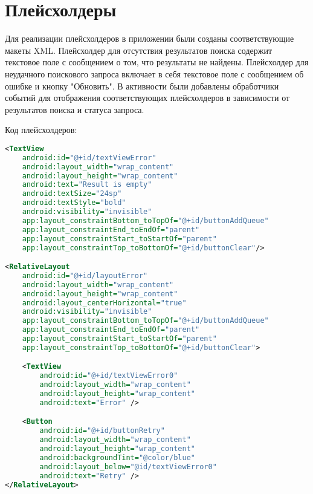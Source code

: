 \section{Плейсхолдеры}

Для реализации плейсхолдеров в приложении были созданы соответствующие макеты
XML. Плейсхолдер для отсутствия результатов поиска содержит текстовое поле
с сообщением о том, что результаты не найдены.
Плейсхолдер для неудачного поискового запроса включает в
себя текстовое поле с сообщением об ошибке и кнопку "Обновить".
В активности были добавлены обработчики событий для отображения
соответствующих плейсхолдеров в зависимости от результатов поиска
и статуса запроса.

Код плейсхолдеров:
\begin{lstlisting}[language=XML]
<TextView
	android:id="@+id/textViewError"
	android:layout_width="wrap_content"
	android:layout_height="wrap_content"
	android:text="Result is empty"
	android:textSize="24sp"
	android:textStyle="bold"
	android:visibility="invisible"
	app:layout_constraintBottom_toTopOf="@+id/buttonAddQueue"
	app:layout_constraintEnd_toEndOf="parent"
	app:layout_constraintStart_toStartOf="parent"
	app:layout_constraintTop_toBottomOf="@+id/buttonClear"/>

<RelativeLayout
	android:id="@+id/layoutError"
	android:layout_width="wrap_content"
	android:layout_height="wrap_content"
	android:layout_centerHorizontal="true"
	android:visibility="invisible"
	app:layout_constraintBottom_toTopOf="@+id/buttonAddQueue"
	app:layout_constraintEnd_toEndOf="parent"
	app:layout_constraintStart_toStartOf="parent"
	app:layout_constraintTop_toBottomOf="@+id/buttonClear">

	<TextView
		android:id="@+id/textViewError0"
		android:layout_width="wrap_content"
		android:layout_height="wrap_content"
		android:text="Error" />

	<Button
		android:id="@+id/buttonRetry"
		android:layout_width="wrap_content"
		android:layout_height="wrap_content"
		android:backgroundTint="@color/blue"
		android:layout_below="@id/textViewError0"
		android:text="Retry" />
</RelativeLayout>
\end{lstlisting}

